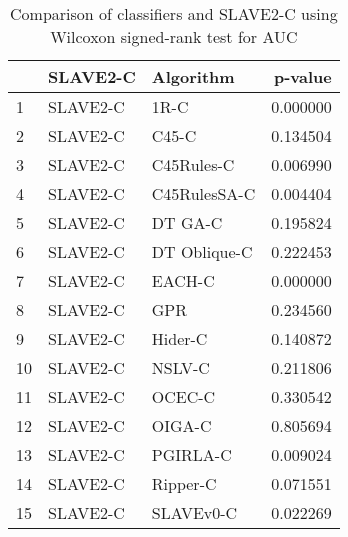 \begin{table}
\footnotesize
\caption{Comparison of classifiers and SLAVE2-C using Wilcoxon signed-rank test for AUC}
\label{tab:SLAVE2-C wilcoxon AUC comparison}
\begin{tabular}{lllr}
\hline
 & SLAVE2-C & Algorithm & p-value \\
\hline
1 & SLAVE2-C & 1R-C & 0.000000 \\
2 & SLAVE2-C & C45-C & 0.134504 \\
3 & SLAVE2-C & C45Rules-C & 0.006990 \\
4 & SLAVE2-C & C45RulesSA-C & 0.004404 \\
5 & SLAVE2-C & DT GA-C & 0.195824 \\
6 & SLAVE2-C & DT Oblique-C & 0.222453 \\
7 & SLAVE2-C & EACH-C & 0.000000 \\
8 & SLAVE2-C & GPR & 0.234560 \\
9 & SLAVE2-C & Hider-C & 0.140872 \\
10 & SLAVE2-C & NSLV-C & 0.211806 \\
11 & SLAVE2-C & OCEC-C & 0.330542 \\
12 & SLAVE2-C & OIGA-C & 0.805694 \\
13 & SLAVE2-C & PGIRLA-C & 0.009024 \\
14 & SLAVE2-C & Ripper-C & 0.071551 \\
15 & SLAVE2-C & SLAVEv0-C & 0.022269 \\
\hline
\end{tabular}
\end{table}
